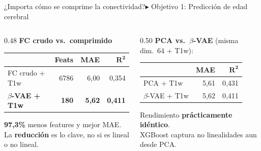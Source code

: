 \documentclass[aspectratio=169, 11pt]{beamer}
\newcommand{\highlight}[1]{\textcolor{uncaccent}{\textbf{#1}}}
\begin{document}
\begin{frame}[shrink=2]{¿Importa cómo se comprime la conectividad?}{\color{uncyellow}\scriptsize $\blacktriangleright$ Objetivo 1: Predicción de edad cerebral}
  \begingroup
  \renewcommand{\arraystretch}{0.92}
  \begin{columns}[T]
    \begin{column}{0.48\textwidth}
      {\footnotesize \textbf{FC crudo vs.\ comprimido}}

      \vspace{0.14cm}
      {\footnotesize
      \begin{tabular}{lrrr}
        \toprule
        & \textbf{Feats} & \textbf{MAE} & $\boldsymbol{R^2}$ \\
        \midrule
        FC crudo + T1w & 6786 & 6,00 & 0,354 \\
        \rowcolor{unclight}
        \textbf{$\beta$-VAE + T1w} & \textbf{180} & \textbf{5,62} & \textbf{0,411} \\
        \bottomrule
      \end{tabular}}

      \vspace{0.18cm}
      {\footnotesize \highlight{97,3\%} menos features y mejor MAE.\\
      La \highlight{reducción} es lo clave, no si es lineal o no lineal.}
    \end{column}
    \begin{column}{0.50\textwidth}
      {\footnotesize \textbf{PCA vs.\ $\beta$-VAE} (misma dim.\ 64 + T1w):}

      \vspace{0.14cm}
      {\footnotesize
      \begin{tabular}{lrr}
        \toprule
        & \textbf{MAE} & $\boldsymbol{R^2}$ \\
        \midrule
        PCA + T1w & 5,61 & 0,431 \\
        $\beta$-VAE + T1w & 5,62 & 0,411 \\
        \bottomrule
      \end{tabular}}

      \vspace{0.18cm}
      {\footnotesize Rendimiento \highlight{prácticamente idéntico}.\\
      XGBoost captura no linealidades aun desde PCA.\\[3pt]
      }
    \end{column}
  \end{columns}
  \endgroup


\end{frame}
\end{document}
